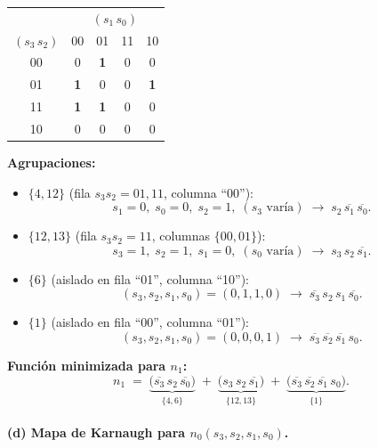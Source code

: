\documentclass[12pt]{article}
\begin{document}
\begin{center}
\begin{tabular}{c|cccc}
  \multicolumn{1}{c}{} & \multicolumn{4}{c}{\((s_{1}\,s_{0})\)} \\[-2pt]
  \cline{2-5}
  \((s_{3}\,s_{2})\) & 00 & 01 & 11 & 10 \\
  \cline{1-5}
  00 & 0 & \bf1 & 0 & 0 \\   %
  01 & \bf1 & 0 & 0 & \bf1 \\%
  11 & \bf1 & \bf1 & 0 & 0 \\%
  10 & 0 & 0 & 0 & 0 \\ 
  \cline{1-5}
\end{tabular}
\end{center}

\noindent
\textbf{Agrupaciones:}
\begin{itemize}
  \item \(\{4,12\}\) (fila \(s_{3}s_{2}=01,11\), columna “00”):  
    \[
      s_{1}=0,\;s_{0}=0,\;s_{2}=1,\;(s_{3}\text{ varía})  
      \;\longrightarrow\; s_{2}\,\overline{s_{1}}\,\overline{s_{0}}.
    \]
  \item \(\{12,13\}\) (fila \(s_{3}s_{2}=11\), columnas \(\{00,01\}\)):  
    \[
      s_{3}=1,\;s_{2}=1,\;s_{1}=0,\;(s_{0}\text{ varía})  
      \;\longrightarrow\; s_{3}\,s_{2}\,\overline{s_{1}}.
    \]
  \item \(\{6\}\) (aislado en fila “01”, columna “10”):  
    \[
      (s_{3},s_{2},s_{1},s_{0}) = (0,1,1,0)  
      \;\longrightarrow\; \overline{s_{3}}\,s_{2}\,s_{1}\,\overline{s_{0}}.
    \]
  \item \(\{1\}\) (aislado en fila “00”, columna “01”):  
    \[
      (s_{3},s_{2},s_{1},s_{0}) = (0,0,0,1)  
      \;\longrightarrow\; \overline{s_{3}}\,\overline{s_{2}}\,\overline{s_{1}}\,s_{0}.
    \]
\end{itemize}

\noindent
\textbf{Función minimizada para \(n_{1}\):}
\[
  n_{1} 
  \;=\; 
    \underbrace{\bigl(\overline{s_{3}}\,s_{2}\,\overline{s_{0}}\bigr)}_{\{4,6\}} 
    \;+\; 
    \underbrace{\bigl(s_{3}\,s_{2}\,\overline{s_{1}}\bigr)}_{\{12,13\}} 
    \;+\; 
    \underbrace{\bigl(\overline{s_{3}}\,\overline{s_{2}}\,\overline{s_{1}}\,s_{0}\bigr)}_{\{1\}}.
\]

\bigskip

\paragraph*{(d) Mapa de Karnaugh para \(n_{0}(s_{3},s_{2},s_{1},s_{0})\).}
\end{document}
